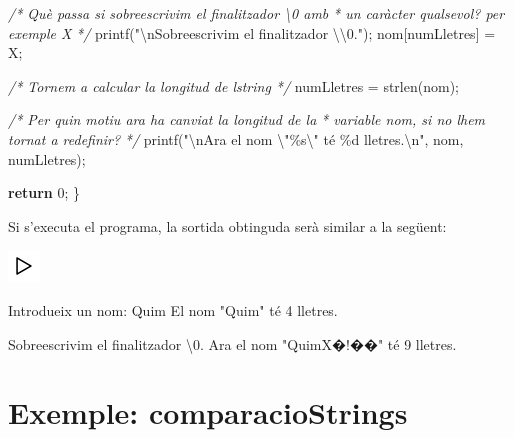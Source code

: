 \documentclass[
]{book}
\newenvironment{Shaded}{\begin{snugshade}}{\end{snugshade}}
\newcommand{\CharTok}[1]{\textcolor[rgb]{0.31,0.60,0.02}{#1}}
\newcommand{\CommentTok}[1]{\textcolor[rgb]{0.56,0.35,0.01}{\textit{#1}}}
\newcommand{\ControlFlowTok}[1]{\textcolor[rgb]{0.13,0.29,0.53}{\textbf{#1}}}
\newcommand{\DecValTok}[1]{\textcolor[rgb]{0.00,0.00,0.81}{#1}}
\newcommand{\NormalTok}[1]{#1}
\newcommand{\SpecialCharTok}[1]{\textcolor[rgb]{0.00,0.00,0.00}{#1}}
\newcommand{\StringTok}[1]{\textcolor[rgb]{0.31,0.60,0.02}{#1}}
\begin{document}
\begin{Shaded}
\begin{Highlighting}[]
    \CommentTok{/* Què passa si sobreescrivim el finalitzador \textquotesingle{}\textbackslash{}0\textquotesingle{} amb}
\CommentTok{     * un caràcter qualsevol? per exemple \textquotesingle{}X\textquotesingle{}}
\CommentTok{     */}
\NormalTok{    printf(}\StringTok{"}\SpecialCharTok{\textbackslash{}n}\StringTok{Sobreescrivim el finalitzador \textquotesingle{}}\SpecialCharTok{\textbackslash{}\textbackslash{}}\StringTok{0\textquotesingle{}."}\NormalTok{);}
\NormalTok{    nom[numLletres] = }\CharTok{\textquotesingle{}X\textquotesingle{}}\NormalTok{;}

    \CommentTok{/* Tornem a calcular la longitud de l\textquotesingle{}string */}
\NormalTok{    numLletres = strlen(nom);}

    \CommentTok{/* Per quin motiu ara ha canviat la longitud de la}
\CommentTok{     * variable nom, si no l\textquotesingle{}hem tornat a redefinir?}
\CommentTok{     */}
\NormalTok{    printf(}\StringTok{"}\SpecialCharTok{\textbackslash{}n}\StringTok{Ara el nom }\SpecialCharTok{\textbackslash{}"}\StringTok{\%s}\SpecialCharTok{\textbackslash{}"}\StringTok{ té \%d lletres.}\SpecialCharTok{\textbackslash{}n}\StringTok{"}\NormalTok{, nom, numLletres);}

    \ControlFlowTok{return} \DecValTok{0}\NormalTok{;}
\NormalTok{\}}
\end{Highlighting}
\end{Shaded}

Si s'executa el programa, la sortida obtinguda serà similar a la següent:

\includegraphics{./img/play.png}

\begin{Shaded}
\begin{Highlighting}[]
\NormalTok{Introdueix un nom: Quim}
\NormalTok{El nom }\StringTok{"Quim"}\NormalTok{ té }\DecValTok{4}\NormalTok{ lletres.}

\NormalTok{Sobreescrivim el finalitzador }\CharTok{\textquotesingle{}\textbackslash{}0\textquotesingle{}}\NormalTok{.}
\NormalTok{Ara el nom }\StringTok{"QuimX�!��"}\NormalTok{ té }\DecValTok{9}\NormalTok{ lletres.}
\end{Highlighting}
\end{Shaded}

\hypertarget{exemple-comparaciostrings}{%
\section{Exemple: comparacioStrings}\label{exemple-comparaciostrings}}
\end{document}
